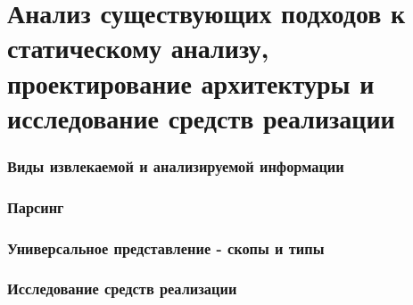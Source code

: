 \section{Анализ существующих подходов к статическому анализу, проектирование архитектуры и
исследование средств реализации}

\subsubsection{Виды извлекаемой и анализируемой информации}



\subsubsection{Парсинг}


\subsubsection{Универсальное представление - скопы и типы}


\subsubsection{Исследование средств реализации}



\clearpage